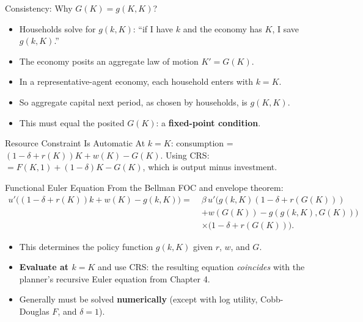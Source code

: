 \documentclass[aspectratio=169,10pt]{beamer}
\newcommand{\apxbutton}[1]{\hfill\hyperlink{#1}{\beamerbutton{Appendix}}}
\begin{document}
\begin{frame}{Consistency: Why $G(K)=g(K,K)$?}
\begin{itemize}
  \item Households solve for $g(k,K)$: ``if I have $k$ and the economy has $K$, I save $g(k,K)$.''
  \item The economy posits an aggregate law of motion $K'=G(K)$.
  \item In a representative-agent economy, each household enters with $k=K$.
  \item So aggregate capital next period, as chosen by households, is $g(K,K)$.
  \item This must equal the posited $G(K)$: a \textbf{fixed-point condition}.
\end{itemize}

\begin{block}{Resource Constraint Is Automatic}
At $k=K$: consumption = $(1-\delta+r(K))K+w(K)-G(K)$. Using CRS: $=F(K,1)+(1-\delta)K-G(K)$, which is output minus investment.
\end{block}
\end{frame}

\begin{frame}{Functional Euler Equation}
\hypertarget{m-a9}{}
\small
From the Bellman FOC and envelope theorem:
\[
\begin{aligned}
u'\big((1-\delta+r(K))k+w(K)-g(k,K)\big)
=\;& \beta\,u'\big(g(k,K)(1-\delta+r(G(K)))\\
&+w(G(K))-g(g(k,K),G(K))\big)\\
&\times \big(1-\delta+r(G(K))\big).
\end{aligned}
\]
\normalsize

\begin{itemize}
  \item This determines the policy function $g(k,K)$ given $r$, $w$, and $G$.
  \item \textbf{Evaluate at $k=K$} and use CRS: the resulting equation \emph{coincides} with the planner's recursive Euler equation from Chapter 4.
  \item Generally must be solved \textbf{numerically} (except with log utility, Cobb-Douglas $F$, and $\delta=1$).
\end{itemize}
\apxbutton{a9}
\end{frame}
\end{document}

